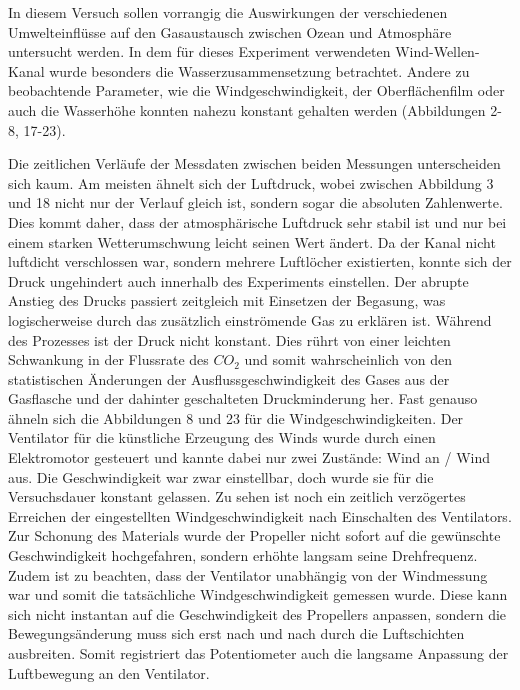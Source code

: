 \documentclass[12pt]{article}
\begin{document}
In diesem Versuch sollen vorrangig die Auswirkungen der verschiedenen Umwelteinflüsse auf den Gasaustausch zwischen Ozean und Atmosphäre untersucht werden. In dem für dieses Experiment verwendeten Wind-Wellen-Kanal wurde besonders die Wasserzusammensetzung betrachtet. Andere zu beobachtende Parameter, wie die Windgeschwindigkeit, der Oberflächenfilm oder auch die Wasserhöhe konnten nahezu konstant gehalten werden (Abbildungen 2-8, 17-23).

Die zeitlichen Verläufe der Messdaten zwischen beiden Messungen unterscheiden sich kaum. Am meisten ähnelt sich der Luftdruck, wobei zwischen Abbildung 3 und 18 nicht nur der Verlauf gleich ist, sondern sogar die absoluten Zahlenwerte. Dies kommt daher, dass der atmosphärische Luftdruck sehr stabil ist und nur bei einem starken Wetterumschwung leicht seinen Wert ändert. Da der Kanal nicht luftdicht verschlossen war, sondern mehrere Luftlöcher existierten, konnte sich der Druck ungehindert auch innerhalb des Experiments einstellen.
Der abrupte Anstieg des Drucks passiert zeitgleich mit Einsetzen der Begasung, was logischerweise durch das zusätzlich einströmende Gas zu erklären ist. Während des Prozesses ist der Druck nicht konstant. Dies rührt von einer leichten Schwankung in der Flussrate des $CO_2$ und somit wahrscheinlich von den statistischen Änderungen der Ausflussgeschwindigkeit des Gases aus der Gasflasche und der dahinter geschalteten Druckminderung her.
Fast genauso ähneln sich die Abbildungen 8 und 23 für die Windgeschwindigkeiten. Der Ventilator für die künstliche Erzeugung des Winds wurde durch einen Elektromotor gesteuert und kannte dabei nur zwei Zustände: Wind an / Wind aus. Die Geschwindigkeit war zwar einstellbar, doch wurde sie für die Versuchsdauer konstant gelassen. Zu sehen ist noch ein zeitlich verzögertes Erreichen der eingestellten Windgeschwindigkeit nach Einschalten des Ventilators.
Zur Schonung des Materials wurde der Propeller nicht sofort auf die gewünschte Geschwindigkeit hochgefahren, sondern erhöhte langsam seine Drehfrequenz. Zudem ist zu beachten, dass der Ventilator unabhängig von der Windmessung war und somit die tatsächliche Windgeschwindigkeit gemessen wurde. Diese kann sich nicht instantan auf die Geschwindigkeit des Propellers anpassen, sondern die Bewegungsänderung muss sich erst nach und nach durch die Luftschichten ausbreiten. Somit registriert das Potentiometer auch die langsame Anpassung der Luftbewegung an den Ventilator.
\end{document}
